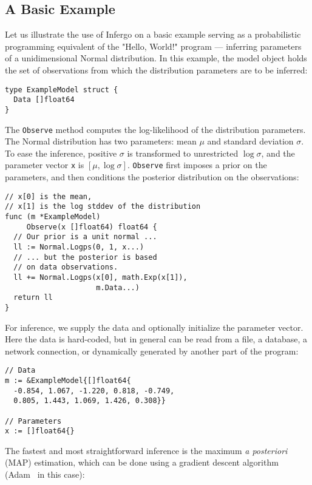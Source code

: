 \documentclass[sigplan,review,10pt,anonymous]{acmart}
\begin{document}
\begin{sloppypar}
\subsection{A Basic Example}
\label{sec:basic-example}

Let us illustrate the use of Infergo on a basic example serving
as a probabilistic programming equivalent of the "Hello, World!"
program --- inferring parameters of a unidimensional Normal
distribution. In this example, the model object holds the set of
observations from which the distribution parameters are to be
inferred:
\begin{lstlisting}
type ExampleModel struct {
  Data []float64
}
\end{lstlisting}

The \lstinline{Observe} method computes the log-likelihood of
the distribution parameters. The Normal distribution has two
parameters: mean $\mu$ and standard deviation $\sigma$. To ease
the inference, positive $\sigma$ is transformed to unrestricted
$\log \sigma$, and the parameter vector \lstinline{x} is $[\mu,
\log \sigma]$. \lstinline{Observe} first imposes a prior on the
parameters, and then conditions the posterior distribution on
the observations:

\begin{lstlisting}
// x[0] is the mean,
// x[1] is the log stddev of the distribution
func (m *ExampleModel)
     Observe(x []float64) float64 {
  // Our prior is a unit normal ...
  ll := Normal.Logps(0, 1, x...)
  // ... but the posterior is based 
  // on data observations.
  ll += Normal.Logps(x[0], math.Exp(x[1]),
                     m.Data...)
  return ll
}
\end{lstlisting}

For inference, we supply the data and optionally initialize the
parameter vector. Here the data is hard-coded, but in general
can be read from a file, a database, a network connection,
or dynamically generated by another part of the program:

\begin{lstlisting}
// Data
m := &ExampleModel{[]float64{
  -0.854, 1.067, -1.220, 0.818, -0.749,
  0.805, 1.443, 1.069, 1.426, 0.308}}

// Parameters
x := []float64{}
\end{lstlisting}
  
The fastest and most straightforward inference is the maximum
\textit{a posteriori} (MAP) estimation, which can be done using
a gradient descent algorithm (Adam~\cite{KB15} in this case):


\end{sloppypar}
\end{document}
